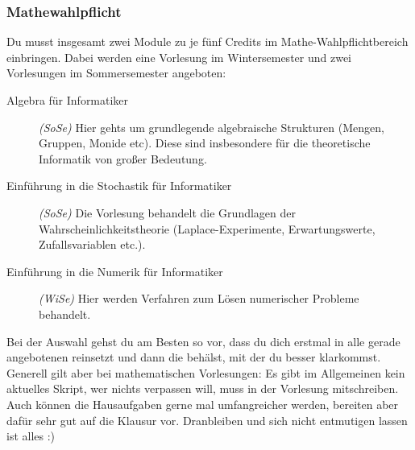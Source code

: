 
\subsubsection{Mathewahlpflicht}
Du musst insgesamt zwei Module zu je fünf Credits
	im Mathe-Wahlpflichtbereich einbringen. Dabei werden eine Vorlesung im Wintersemester und zwei
	Vorlesungen im Sommersemester angeboten:

	
	\begin{description} 
		\item[Algebra für Informatiker] \emph{(SoSe)} Hier gehts um grundlegende
		algebraische Strukturen (Mengen, Gruppen, Monide etc). Diese sind insbesondere für die
		theoretische Informatik von großer Bedeutung.
		\item[Einführung in die Stochastik für Informatiker] \emph{(SoSe)} Die
		Vorlesung behandelt die Grundlagen der
		Wahrscheinlichkeitstheorie (Laplace-Experimente,
		Erwartungswerte, Zufallsvariablen etc.). 
		\item[Einführung in die Numerik für Informatiker] \emph{(WiSe)} Hier werden Verfahren zum Lösen numerischer Probleme behandelt. 
	\end{description}

	Bei der Auswahl gehst du am Besten so vor, dass du dich erstmal
	in alle gerade angebotenen reinsetzt und dann die behälst, mit der du besser
	klarkommst. Generell gilt aber bei mathematischen Vorlesungen: Es
	gibt im Allgemeinen kein aktuelles Skript, wer nichts verpassen
	will, muss in der Vorlesung mitschreiben. Auch können die
	Hausaufgaben gerne mal umfangreicher werden, bereiten aber dafür
	sehr gut auf die Klausur vor. Dranbleiben und sich nicht
	entmutigen lassen ist alles :)